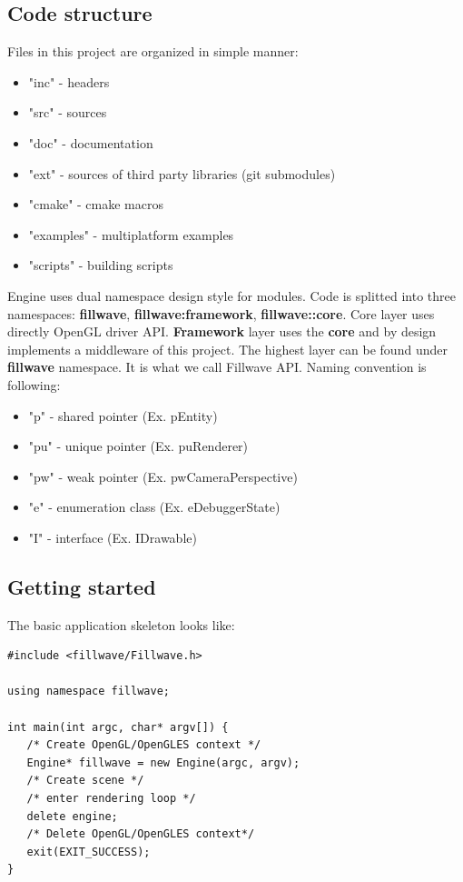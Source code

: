 \documentclass{article}
\begin{document}
\subsection{Code structure}\label{sec:Code structure}
\indent Files in this project are organized in simple manner:
\begin{itemize}
  \item "inc" - headers
  \item "src" - sources
  \item "doc" - documentation
  \item "ext" - sources of third party libraries (git submodules)
  \item "cmake" - cmake macros
  \item "examples" - multiplatform examples
  \item "scripts" - building scripts
\end{itemize}
\indent \indent Engine uses dual namespace design style for modules. Code is splitted into three namespaces: \textbf{fillwave}, \textbf{fillwave:framework}, \textbf{fillwave::core}. Core layer uses directly OpenGL driver API. \textbf{Framework} layer uses the \textbf{core} and by design implements a middleware of this project. The highest layer can be found under \textbf{fillwave} namespace. It is what we call Fillwave API. Naming convention is following:
\begin{itemize}
  \item "p" - shared pointer (Ex. pEntity)
  \item "pu" - unique pointer (Ex. puRenderer)
  \item "pw" - weak pointer (Ex. pwCameraPerspective)
  \item "e" - enumeration class (Ex. eDebuggerState)
  \item "I" - interface (Ex. IDrawable)
\end{itemize}

\subsection{Getting started}\label{sec:Getting started}
\indent \indent The basic application skeleton looks like:

\begin{lstlisting}
#include <fillwave/Fillwave.h>

using namespace fillwave;

int main(int argc, char* argv[]) {
   /* Create OpenGL/OpenGLES context */
   Engine* fillwave = new Engine(argc, argv);
   /* Create scene */
   /* enter rendering loop */
   delete engine;
   /* Delete OpenGL/OpenGLES context*/
   exit(EXIT_SUCCESS);
}
\end{lstlisting}
\end{document}
